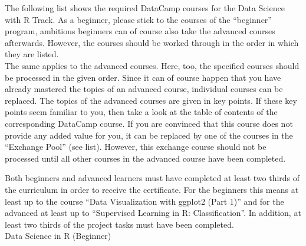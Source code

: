 \documentclass[
  11pt,
]{article}
\begin{document}
The following list shows the required DataCamp courses for the Data Science with R Track. As a beginner, please stick to the courses of the ``beginner'' program, ambitious beginners can of course also take the advanced courses afterwards. However, the courses should be worked through in the order in which they are listed.\\
The same applies to the advanced courses. Here, too, the specified courses should be processed in the given order. Since it can of course happen that you have already mastered the topics of an advanced course, individual courses can be replaced. The topics of the advanced courses are given in key points. If these key points seem familiar to you, then take a look at the table of contents of the corresponding DataCamp course. If you are convinced that this course does not provide any added value for you, it can be replaced by one of the courses in the ``Exchange Pool'' (see list). However, this exchange course should not be processed until all other courses in the advanced course have been completed.

Both beginners and advanced learners must have completed at least two thirds of the curriculum in order to receive the certificate. For the beginners this means at least up to the course ``Data Visualization with ggplot2 (Part 1)'' and for the advanced at least up to ``Supervised Learning in R: Classification''. In addition, at least two thirds of the project tasks must have been completed.\\
Data Science in R (Beginner)
\end{document}
